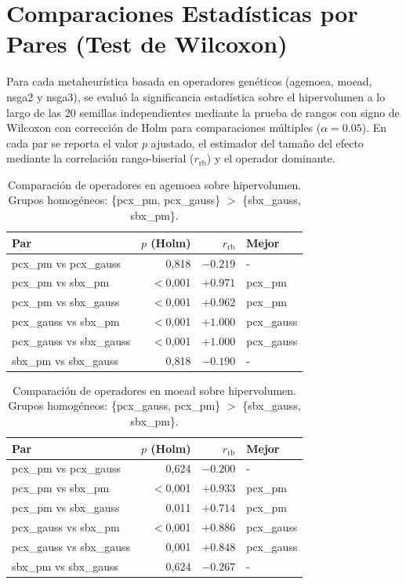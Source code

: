 \section{Comparaciones Estadísticas por Pares (Test de Wilcoxon)}
\label{sec:apendice_wilcoxon_operadores}

Para cada metaheurística basada en operadores genéticos (\acrshort{agemoea}, \acrshort{moead}, \acrshort{nsga2} y \acrshort{nsga3}), se evaluó la significancia estadística sobre el hipervolumen a lo largo de las 20 semillas independientes mediante la prueba de rangos con signo de Wilcoxon con corrección de Holm para comparaciones múltiples ($\alpha = 0.05$). En cada par se reporta el valor $p$ ajustado, el estimador del tamaño del efecto mediante la correlación rango-biserial ($r_{\text{rb}}$) y el operador dominante.

\begin{table}[H]
\centering
\caption{Comparación de operadores en \acrshort{agemoea} sobre hipervolumen. Grupos homogéneos: \{pcx\_pm, pcx\_gauss\} $>$ \{sbx\_gauss, sbx\_pm\}.}
\label{tab:ops_agemoea}
\begin{tabular}{lrrl}
\toprule
Par & $p$ (Holm) & $r_{\text{rb}}$ & Mejor \\
\midrule
pcx\_pm vs pcx\_gauss & 0,818 & $-0.219$ & - \\
pcx\_pm vs sbx\_pm & $<$0,001 & $+0.971$ & pcx\_pm \\
pcx\_pm vs sbx\_gauss & $<$0,001 & $+0.962$ & pcx\_pm \\
pcx\_gauss vs sbx\_pm & $<$0,001 & $+1.000$ & pcx\_gauss \\
pcx\_gauss vs sbx\_gauss & $<$0,001 & $+1.000$ & pcx\_gauss \\
sbx\_pm vs sbx\_gauss & 0,818 & $-0.190$ & - \\
\bottomrule
\end{tabular}
\end{table}

\begin{table}[H]
\centering
\caption{Comparación de operadores en \acrshort{moead} sobre hipervolumen. Grupos homogéneos: \{pcx\_gauss, pcx\_pm\} $>$ \{sbx\_gauss, sbx\_pm\}.}
\label{tab:ops_moead}
\begin{tabular}{lrrl}
\toprule
Par & $p$ (Holm) & $r_{\text{rb}}$ & Mejor \\
\midrule
pcx\_pm vs pcx\_gauss & 0,624 & $-0.200$ & - \\
pcx\_pm vs sbx\_pm & $<$0,001 & $+0.933$ & pcx\_pm \\
pcx\_pm vs sbx\_gauss & 0,011 & $+0.714$ & pcx\_pm \\
pcx\_gauss vs sbx\_pm & $<$0,001 & $+0.886$ & pcx\_gauss \\
pcx\_gauss vs sbx\_gauss & 0,001 & $+0.848$ & pcx\_gauss \\
sbx\_pm vs sbx\_gauss & 0,624 & $-0.267$ & - \\
\bottomrule
\end{tabular}
\end{table}

